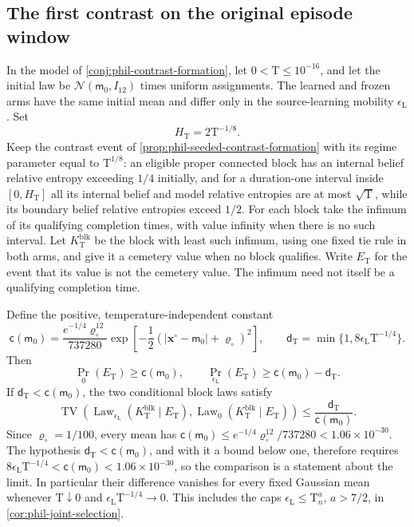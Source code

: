 \subsection{The first contrast on the original episode window}

In the model of \cref{conj:phil-contrast-formation}, let
\(0<\mathrm T\le10^{-16}\), and let the initial law be
\(\mathcal N(\mathsf m_0,I_{12})\) times uniform assignments.
The learned and frozen arms have the same initial mean and differ only in
the source-learning mobility \(\epsilon_{\mathrm L}\).
Set
\[
 H_{\mathrm T}=2\mathrm T^{-1/8}.
\]
Keep the contrast event of \cref{prop:phil-seeded-contrast-formation}
with its regime parameter equal to \(\mathrm T^{1/8}\): an eligible
proper connected block has an internal belief relative entropy exceeding
\(1/4\) initially, and for a duration-one interval inside
\([0,H_{\mathrm T}]\) all its internal belief and model relative
entropies are at most \(\sqrt{\mathrm T}\), while its boundary belief
relative entropies exceed \(1/2\).
For each block take the infimum of its qualifying completion times,
with value infinity when there is no such interval. Let \(K^{\mathrm{blk}}_{\mathrm T}\)
be the block with least such infimum, using one fixed tie rule in both
arms, and give it a cemetery value when no block qualifies. Write
\(E_{\mathrm T}\) for the event that its value is not the cemetery value.
The infimum need not itself be a qualifying completion time.

Define the positive, temperature-independent constant
\[
 \mathsf c(\mathsf m_0)
 =\frac{e^{-1/4}\varrho_\circ^{12}}{737280}
   \exp\left[-\frac12
       (|\mathbf x^\circ-\mathsf m_0|+\varrho_\circ)^2\right],
 \qquad
 \mathsf d_{\mathrm T}
 =\min\{1,8\epsilon_{\mathrm L}\mathrm T^{-1/4}\}.
\]
Then
\[
 \Pr_0(E_{\mathrm T})\ge\mathsf c(\mathsf m_0),
 \qquad
 \Pr_{\epsilon_{\mathrm L}}(E_{\mathrm T})
       \ge\mathsf c(\mathsf m_0)-\mathsf d_{\mathrm T}.
\]
If \(\mathsf d_{\mathrm T}<\mathsf c(\mathsf m_0)\), the two
conditional block laws satisfy
\[
 \operatorname{TV}\left(
 \operatorname{Law}_{\epsilon_{\mathrm L}}(K^{\mathrm{blk}}_{\mathrm T}\mid E_{\mathrm T}),
 \operatorname{Law}_0(K^{\mathrm{blk}}_{\mathrm T}\mid E_{\mathrm T})\right)
 \le\frac{\mathsf d_{\mathrm T}}{\mathsf c(\mathsf m_0)}.
\]
Since \(\varrho_\circ=1/100\), every mean has
\(\mathsf c(\mathsf m_0)\le e^{-1/4}\varrho_\circ^{12}/737280
<1.06\times10^{-30}\). The hypothesis
\(\mathsf d_{\mathrm T}<\mathsf c(\mathsf m_0)\), and with it a bound below
one, therefore requires
\(8\epsilon_{\mathrm L}\mathrm T^{-1/4}<\mathsf c(\mathsf m_0)<1.06\times10^{-30}\),
so the comparison is a statement about the limit.
In particular their difference vanishes for every fixed Gaussian mean
whenever
\(\mathrm T\downarrow0\) and
\(\epsilon_{\mathrm L}\mathrm T^{-1/4}\to0\).
This includes the caps
\(\epsilon_{\mathrm L}\le\mathrm T_n^a\), \(a>7/2\), in
\cref{cor:phil-joint-selection}.

